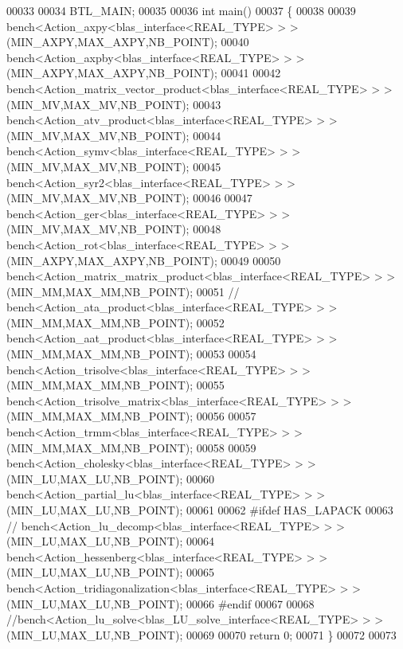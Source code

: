 \begin{DoxyCode}
00033 
00034 BTL\_MAIN;
00035 
00036 \textcolor{keywordtype}{int} main()
00037 \{
00038 
00039   bench<Action\_axpy<blas\_interface<REAL\_TYPE> > >(MIN\_AXPY,MAX\_AXPY,NB\_POINT);
00040   bench<Action\_axpby<blas\_interface<REAL\_TYPE> > >(MIN\_AXPY,MAX\_AXPY,NB\_POINT);
00041 
00042   bench<Action\_matrix\_vector\_product<blas\_interface<REAL\_TYPE> > >(MIN\_MV,MAX\_MV,NB\_POINT);
00043   bench<Action\_atv\_product<blas\_interface<REAL\_TYPE> > >(MIN\_MV,MAX\_MV,NB\_POINT);
00044   bench<Action\_symv<blas\_interface<REAL\_TYPE> > >(MIN\_MV,MAX\_MV,NB\_POINT);
00045   bench<Action\_syr2<blas\_interface<REAL\_TYPE> > >(MIN\_MV,MAX\_MV,NB\_POINT);
00046 
00047   bench<Action\_ger<blas\_interface<REAL\_TYPE> > >(MIN\_MV,MAX\_MV,NB\_POINT);
00048   bench<Action\_rot<blas\_interface<REAL\_TYPE> > >(MIN\_AXPY,MAX\_AXPY,NB\_POINT);
00049 
00050   bench<Action\_matrix\_matrix\_product<blas\_interface<REAL\_TYPE> > >(MIN\_MM,MAX\_MM,NB\_POINT);
00051 \textcolor{comment}{//   bench<Action\_ata\_product<blas\_interface<REAL\_TYPE> > >(MIN\_MM,MAX\_MM,NB\_POINT);}
00052   bench<Action\_aat\_product<blas\_interface<REAL\_TYPE> > >(MIN\_MM,MAX\_MM,NB\_POINT);
00053 
00054   bench<Action\_trisolve<blas\_interface<REAL\_TYPE> > >(MIN\_MM,MAX\_MM,NB\_POINT);
00055   bench<Action\_trisolve\_matrix<blas\_interface<REAL\_TYPE> > >(MIN\_MM,MAX\_MM,NB\_POINT);
00056 
00057   bench<Action\_trmm<blas\_interface<REAL\_TYPE> > >(MIN\_MM,MAX\_MM,NB\_POINT);
00058 
00059   bench<Action\_cholesky<blas\_interface<REAL\_TYPE> > >(MIN\_LU,MAX\_LU,NB\_POINT);
00060   bench<Action\_partial\_lu<blas\_interface<REAL\_TYPE> > >(MIN\_LU,MAX\_LU,NB\_POINT);
00061 
00062 \textcolor{preprocessor}{  #ifdef HAS\_LAPACK}
00063 \textcolor{comment}{//   bench<Action\_lu\_decomp<blas\_interface<REAL\_TYPE> > >(MIN\_LU,MAX\_LU,NB\_POINT);}
00064   bench<Action\_hessenberg<blas\_interface<REAL\_TYPE> > >(MIN\_LU,MAX\_LU,NB\_POINT);
00065   bench<Action\_tridiagonalization<blas\_interface<REAL\_TYPE> > >(MIN\_LU,MAX\_LU,NB\_POINT);
00066 \textcolor{preprocessor}{  #endif}
00067 
00068   \textcolor{comment}{//bench<Action\_lu\_solve<blas\_LU\_solve\_interface<REAL\_TYPE> > >(MIN\_LU,MAX\_LU,NB\_POINT);}
00069 
00070   \textcolor{keywordflow}{return} 0;
00071 \}
00072 
00073 
\end{DoxyCode}
